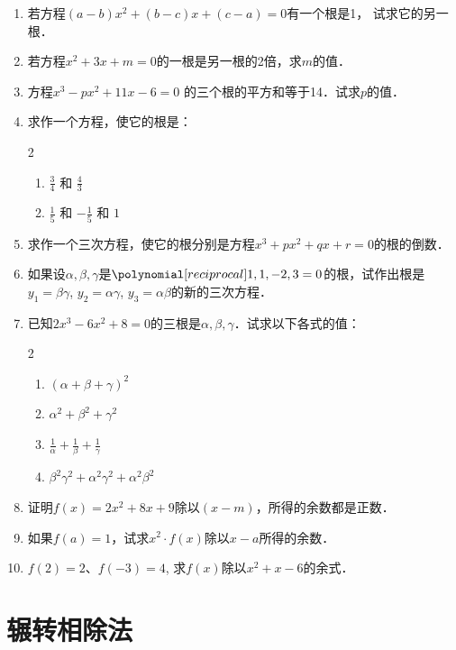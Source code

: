 \begin{enumerate}
\item 若方程$(a-b)x^2+(b-c)x+(c-a)=0$有一个根是1，
试求它的另一根．
\item 若方程$x^2+3x+m=0$的一根是另一根的2倍，求$m$的值．
\item 方程$x^3-px^2+11x-6=0$ 的三个根的平方和等于14．试求$p$的值．
\item 求作一个方程，使它的根是：
\begin{multicols}{2}
    \begin{enumerate}
    \item $\frac{3}{4}$ 和 $\frac{4}{3}$
    \item $\frac{1}{5}$ 和 $-\frac{1}{5}$ 和 $1$
\end{enumerate}
\end{multicols}

\item 求作一个三次方程，使它的根分别是方程$x^3+px^2+qx+r=0$的根的倒数．

\item 如果设$\alpha,\beta,
\gamma$是$\poly{1,1,-2,3}=0$的根，试作出根是
$y_1=\beta\gamma$, $y_2=\alpha\gamma$, $y_3=\alpha\beta$的新的三次方程．

\item 已知$2x^3-6x^2+8=0$的三根是$\alpha,\beta,
\gamma$．试求以下各式的值：
\begin{multicols}{2}
    \begin{enumerate}
    \item $(\alpha+\beta+\gamma)^2$ 
    \item $\alpha^2+\beta^2+\gamma^2$ 
    \item $\frac{1}{\alpha}+\frac{1}{\beta}+\frac{1}{\gamma}$
    \item $\beta^2\gamma^2+\alpha^2\gamma^2+\alpha^2\beta^2$
\end{enumerate}
\end{multicols}

\item 证明$f(x)=2x^2+8x+9$除以$(x-m)$，所得的余数都是正数．

\item 如果$f(a)=1$，试求$x^2\cdot f(x)$除以$x-a$所得的余数．

\item $f(2)=2$、$f(-3)=4$, 求$f(x)$除以$x^2+x-6$的余式．

\end{enumerate}


\section{辗转相除法}
